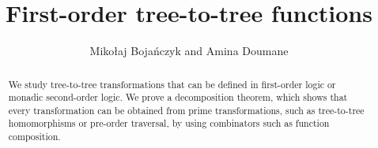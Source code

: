 \documentclass[sigplan,10pt]{acmart}\settopmatter{printfolios=true,printccs=false,printacmref=false}
\begin{document}
 \title{First-order tree-to-tree functions}
 \author{Miko\l{}aj Boja\'nczyk and Amina Doumane}
 \begin{abstract}
    We study tree-to-tree transformations that can be defined in   first-order logic or  monadic second-order logic. We prove a decomposition theorem, which shows that every transformation can be obtained from  prime transformations, such as tree-to-tree homomorphisms or pre-order traversal, by using combinators such as function composition. 
\end{abstract}

 \maketitle






%


%

% 
%






\pagebreak
\appendix








% 
\end{document}
